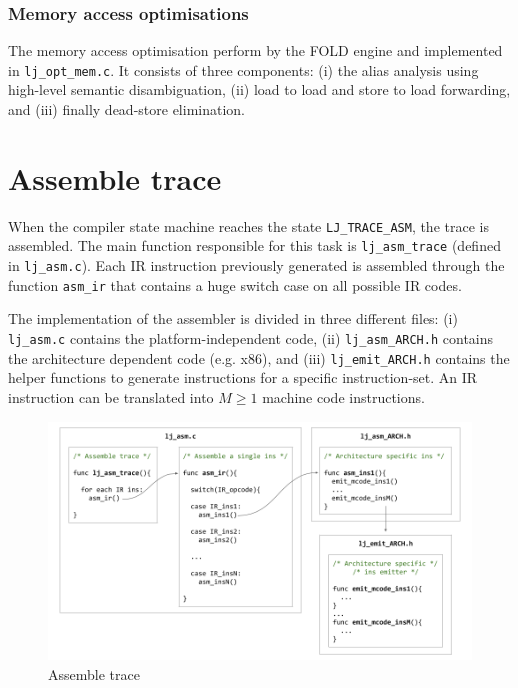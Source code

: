 \subsubsection{Memory access optimisations}
\label{Subsubsec:mao}

The memory access optimisation perform by the FOLD engine and implemented
in \texttt{lj\_opt\_mem.c}. It consists of three components: (i) the alias
analysis using high-level semantic disambiguation, (ii) load to load and store to load
forwarding, and (iii) finally dead-store elimination.



\section{Assemble trace}
When the compiler state machine reaches the state \texttt{LJ\_TRACE\_ASM}, the trace is assembled. The main function responsible for this task is \texttt{lj\_asm\_trace} (defined in \texttt{lj\_asm.c}). 
Each IR instruction previously generated is assembled through the function \texttt{asm\_ir} that contains a huge switch case on all possible IR codes. 

The implementation of the assembler is divided in three different files: (i) \texttt{lj\_asm.c} contains the platform-independent code, (ii) \texttt{lj\_asm\_ARCH.h} contains the architecture dependent code (e.g. x86), and (iii) \texttt{lj\_emit\_ARCH.h} contains the helper functions to generate instructions for a specific instruction-set. An IR instruction can be translated into $M\geq1$ machine code instructions.

\begin{figure}[H]
    \centering
	\includegraphics[width=\textwidth]{images/chapter7/Assemble_Trace.png}
    \caption{Assemble trace}
    \label{fig:assemble-trace}
\end{figure}

